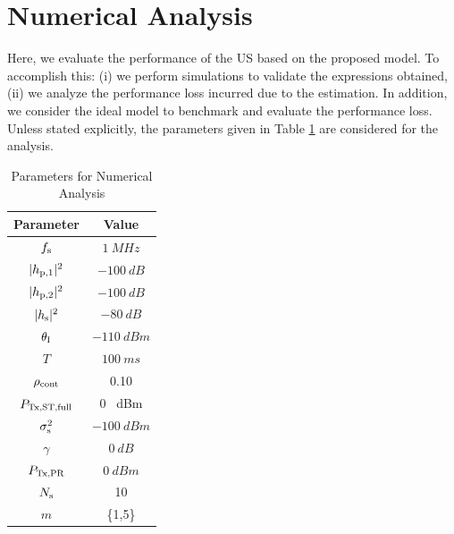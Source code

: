 \section{Numerical Analysis} \label{sec:num_ana}
Here, we evaluate the performance of the US based on the proposed model. To accomplish this: (i) we perform simulations to validate the expressions obtained, (ii) we analyze the performance loss incurred due to the estimation. In addition, we consider the ideal model to benchmark and evaluate the performance loss. %
Unless stated explicitly, the parameters given in Table \ref{tb:tb2} are considered for the analysis.%



\begin{table}
\renewcommand{\arraystretch}{1.2}
\caption{Parameters for Numerical Analysis}
\label{tb:tb2}
\centering
\begin{tabular}{c||c}
\hline
\bfseries Parameter & \bfseries Value \\
\hline\hline
$f_{\text{s}}$  & $\SI{1}{MHz}$ \\ 
$|h_{\text{p,1}}|^2$ & $\SI{-100}{dB}$ \\ 
$|h_{\text{p,2}}|^2$ & $\SI{-100}{dB}$ \\ 
$|h_{\text{s}}|^2$ & $\SI{-80}{dB}$ \\ 
$\theta_{\text{I}}$ & $\SI{-110}{dBm}$ \\ 
$T$ & $\SI{100}{ms}$ \\ 
$\rho_{\text{cont}}$ & 0.10 \\ 
$P_{\text{Tx,ST,full}}$ & 0 \SI{}{dBm} \\ 
$\sigma^2_{\text{s}}$ & $\SI{-100}{dBm}$ \\ 
$\gamma$ & $\SI{0}{dB}$ \\ 
$P_{\text{Tx,PR}}$ & $\SI{0}{dBm}$ \\ 
$N_{\text{s}}$ & 10 \\ 
$m$ & \{1,5\} \\ \hline
\end{tabular}%
\end{table}

